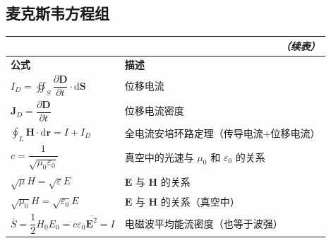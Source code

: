\documentclass[UTF8]{ctexart}
\newcommand\Emph[1]{\colorbox{green!10}{\textcolor{green!30!black}{#1}}}
\newcommand\Example[1]{\textcolor{cyan!70!black}{\small #1}}
\renewcommand\d{\mathrm{d}}
\renewcommand\S{\boldsymbol{S}}
\renewcommand\H{\boldsymbol{H}}
\begin{document}
\subsection{麦克斯韦方程组}
\begin{longtable}{|p{}|p{}|}
    \multicolumn{2}{r}{\textit{（续表）}} \\
    \hline
\endhead
    \hline
\endfirsthead
\endfoot
    \hline
\endlastfoot

    \textbf{公式} & \textbf{描述} \\
    \hline
    $\displaystyle I_D = \oiint_S \dfrac{\partial \boldsymbol{D}}{\partial t}\cdot \d\S$ & 位移电流 \\
    \hline
    $\boldsymbol{J}_D = \dfrac{\partial \boldsymbol{D}}{\partial t}$ & 位移电流密度 \\
    \hline
    $\displaystyle\oint _L \H\cdot\d\boldsymbol{r} = I + I_D$ & 全电流安培环路定理\Example{（传导电流+位移电流）} \\
    \hline
    $c = \dfrac{1}{\sqrt{\mu_0\varepsilon_0}}$ & 真空中的光速与 $\mu_0$ 和 $\varepsilon_0$ 的关系 \\
    \hline
    $\sqrt{\mu} H = \sqrt{\varepsilon} E$ & $\boldsymbol{E}$ 与 $\H$ 的关系 \\
    \hline
    \Emph{$\sqrt{\mu_0} H = \sqrt{\varepsilon_0} E$} & $\boldsymbol{E}$ 与 $\H$ 的关系\Example{（真空中）} \\
    \hline
    $\overline{S} = \dfrac12 H_0 E_0  = c\varepsilon_0 \overline{\boldsymbol{E}^2} = I$ & 电磁波平均能流密度\Example{（也等于波强）} \\
\end{longtable}
\end{document}
